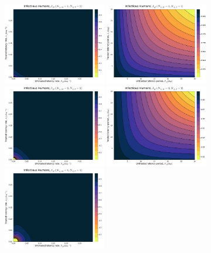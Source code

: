 \documentclass[11pt]{article}
\begin{document}
\begin{figure}[H]
  \centering
  \includegraphics[width=0.4\textwidth]{../../fig/Ih_rates_SMxST_1x1_uncal.pdf}
  \includegraphics[width=0.4\textwidth]{../../fig/Ih_periods_SMxST_1x1_uncal.pdf}\\
  \includegraphics[width=0.4\textwidth]{../../fig/Ih_rates_SMxST_2x2_uncal.pdf}
  \includegraphics[width=0.4\textwidth]{../../fig/Ih_periods_SMxST_2x2_uncal.pdf}\\
  \includegraphics[width=0.4\textwidth]{../../fig/Ih_rates_SMxST_4x4_uncal.pdf}

\end{figure}
\end{document}
